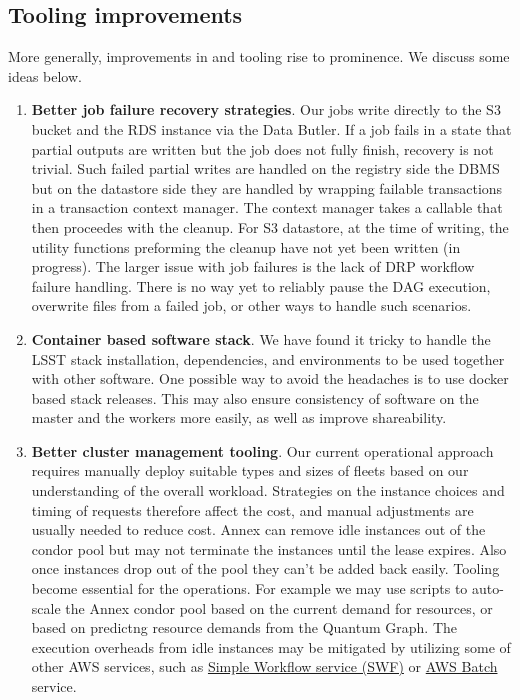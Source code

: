 \subsection{Tooling improvements}

More generally, improvements in and tooling rise to prominence.
We discuss some ideas below.

\begin{enumerate}
\item \textbf{Better job failure recovery strategies}.
Our jobs write directly to the S3 bucket and the RDS instance via the Data Butler.
If a job fails in a state that partial outputs are written but the job does not fully finish, recovery is not trivial.
Such failed partial writes are handled on the registry side the DBMS but on the datastore side they are handled by wrapping failable transactions in a transaction context manager.
The context manager takes a callable that then proceedes with the cleanup.
For S3 datastore, at the time of writing, the utility functions preforming the cleanup have not yet been written (in progress).
The larger issue with job failures is the lack of DRP workflow failure handling.
There is no way yet to reliably pause the DAG execution, overwrite files from a failed job, or other ways to handle such scenarios.
\item \textbf{Container based software stack}.
We have found it tricky to handle the LSST stack installation, dependencies, and environments to be used together with other software.
One possible way to avoid the headaches is to use docker based stack releases.
This may also ensure consistency of software on the master and the workers more easily, as well as improve shareability.
\item \textbf{Better cluster management tooling}.
Our current operational approach requires manually deploy suitable types and sizes of fleets based on our understanding of the overall workload.
Strategies on the instance choices and timing of requests therefore affect the cost, and manual adjustments are usually needed to reduce cost.
Annex can remove idle instances out of the condor pool but may not terminate the instances until the lease expires.
Also once instances drop out of the pool they can't be added back easily.
Tooling become essential for the operations.
For example we may use scripts to auto-scale the Annex condor pool based on the current demand for resources, or based on predictng resource demands from the Quantum Graph.
The execution overheads from idle instances may be mitigated by utilizing some of other AWS services, such as \href{https://aws.amazon.com/swf/}{Simple Workflow service (SWF)} or \href{https://aws.amazon.com/batch/}{AWS Batch} service.

\end{enumerate}
